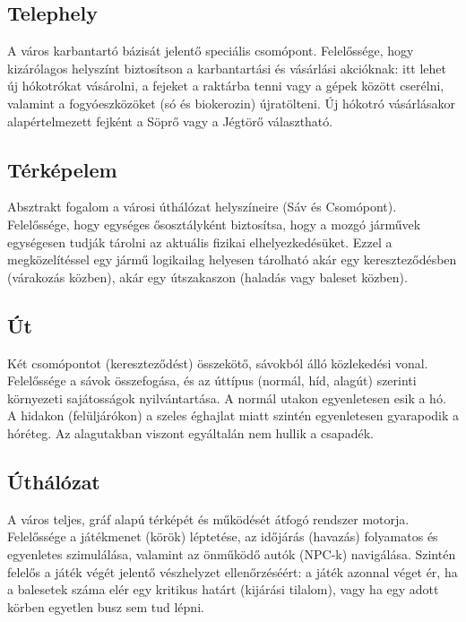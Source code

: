 \subsection{Telephely}
\par{A város karbantartó bázisát jelentő speciális csomópont. Felelőssége, hogy kizárólagos helyszínt biztosítson a karbantartási és vásárlási akcióknak: itt lehet új hókotrókat vásárolni, a fejeket a raktárba tenni vagy a gépek között cserélni, valamint a fogyóeszközöket (só és biokerozin) újratölteni. Új hókotró vásárlásakor alapértelmezett fejként a Söprő vagy a Jégtörő választható.}

\subsection{Térképelem}
\par{Absztrakt fogalom a városi úthálózat helyszíneire (Sáv és Csomópont). Felelőssége, hogy egységes ősosztályként biztosítsa, hogy a mozgó járművek egységesen tudják tárolni az aktuális fizikai elhelyezkedésüket. Ezzel a megközelítéssel egy jármű logikailag helyesen tárolható akár egy kereszteződésben (várakozás közben), akár egy útszakaszon (haladás vagy baleset közben).}

\subsection{Út}
\par{Két csomópontot (kereszteződést) összekötő, sávokból álló közlekedési vonal. Felelőssége a sávok összefogása, és az úttípus (normál, híd, alagút) szerinti környezeti sajátosságok nyilvántartása. A normál utakon egyenletesen esik a hó. A hidakon (felüljárókon) a szeles éghajlat miatt szintén egyenletesen gyarapodik a hóréteg. Az alagutakban viszont egyáltalán nem hullik a csapadék.}

\subsection{Úthálózat}
\par{A város teljes, gráf alapú térképét és működését átfogó rendszer motorja. Felelőssége a játékmenet (körök) léptetése, az időjárás (havazás) folyamatos és egyenletes szimulálása, valamint az önműködő autók (NPC-k) navigálása. Szintén felelős a játék végét jelentő vészhelyzet ellenőrzéséért: a játék azonnal véget ér, ha a balesetek száma elér egy kritikus határt (kijárási tilalom), vagy ha egy adott körben egyetlen busz sem tud lépni.}

